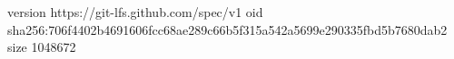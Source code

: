 version https://git-lfs.github.com/spec/v1
oid sha256:706f4402b4691606fcc68ae289c66b5f315a542a5699e290335fbd5b7680dab2
size 1048672
